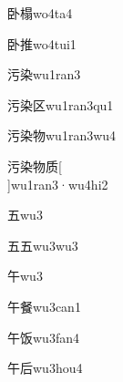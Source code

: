 \begin{verbete}[8;14]{卧榻}{wo4ta4}
\end{verbete}

\begin{verbete}[8;11]{卧推}{wo4tui1}
\end{verbete}

\begin{verbete}[6;9]{污染}{wu1ran3}
\end{verbete}

\begin{verbete}[6;9;4]{污染区}{wu1ran3qu1}
\end{verbete}

\begin{verbete}[6;9;8]{污染物}{wu1ran3wu4}
\end{verbete}

\begin{verbete}[6;9;8;8]{污染物质}[\\]{wu1ran3·wu4hi2}
\end{verbete}

\begin{verbete}[4]{五}{wu3}
\end{verbete}

\begin{verbete}[4;4]{五五}{wu3wu3}
\end{verbete}

\begin{verbete}[4]{午}{wu3}
\end{verbete}

\begin{verbete}[4;16]{午餐}{wu3can1}
\end{verbete}

\begin{verbete}[4;7]{午饭}{wu3fan4}
\end{verbete}

\begin{verbete}[4;6]{午后}{wu3hou4}
\end{verbete}

